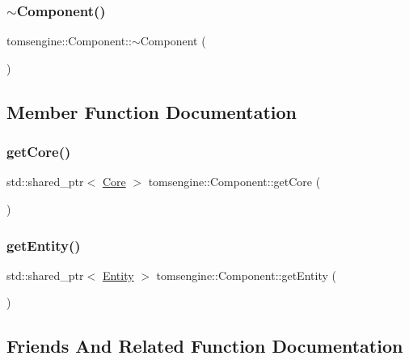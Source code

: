 \subsubsection{\texorpdfstring{$\sim$\+Component()}{~Component()}}
{\footnotesize\ttfamily tomsengine\+::\+Component\+::$\sim$\+Component (\begin{DoxyParamCaption}{ }\end{DoxyParamCaption})\hspace{0.3cm}{\ttfamily [virtual]}}



\subsection{Member Function Documentation}
\mbox{\label{classtomsengine_1_1_component_a377e917bf99c007b30ff12ceedd666ee}} 
\subsubsection{\texorpdfstring{get\+Core()}{getCore()}}
{\footnotesize\ttfamily std\+::shared\+\_\+ptr$<$ \mbox{\hyperlink{classtomsengine_1_1_core}{Core}} $>$ tomsengine\+::\+Component\+::get\+Core (\begin{DoxyParamCaption}{ }\end{DoxyParamCaption})}

\mbox{\label{classtomsengine_1_1_component_a7091b67f11bc3b64db3d913e255a7840}} 
\subsubsection{\texorpdfstring{get\+Entity()}{getEntity()}}
{\footnotesize\ttfamily std\+::shared\+\_\+ptr$<$ \mbox{\hyperlink{classtomsengine_1_1_entity}{Entity}} $>$ tomsengine\+::\+Component\+::get\+Entity (\begin{DoxyParamCaption}{ }\end{DoxyParamCaption})}



\subsection{Friends And Related Function Documentation}
\mbox{\label{classtomsengine_1_1_component_a614439ccac0344926adc4c0165d64060}} 
